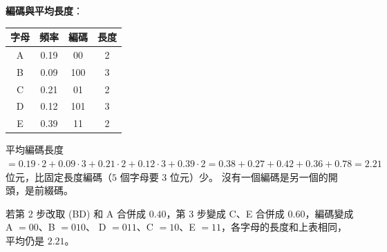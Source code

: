 \begin{pastsoln}
\textbf{編碼與平均長度}：
\begin{center}
\begin{tabular}{cccc}
\toprule
字母 & 頻率 & 編碼 & 長度 \\
\midrule
A & 0.19 & 00 & 2 \\
B & 0.09 & 100 & 3 \\
C & 0.21 & 01 & 2 \\
D & 0.12 & 101 & 3 \\
E & 0.39 & 11 & 2 \\
\bottomrule
\end{tabular}
\end{center}
平均編碼長度 $= 0.19 \cdot 2 + 0.09 \cdot 3 + 0.21 \cdot 2 + 0.12 \cdot 3 + 0.39 \cdot 2 = 0.38 + 0.27 + 0.42 + 0.36
+ 0.78 = 2.21$ 位元，比固定長度編碼（$5$ 個字母要 $3$ 位元）少。 沒有一個編碼是另一個的開頭，是前綴碼。

若第 2 步改取 (BD) 和 A 合併成 $0.40$，第 3 步變成 C、E 合併成 $0.60$，編碼變成 A $= 00$、B $= 010$、
D $= 011$、C $= 10$、E $= 11$，各字母的長度和上表相同，平均仍是 $2.21$。
\end{pastsoln}
